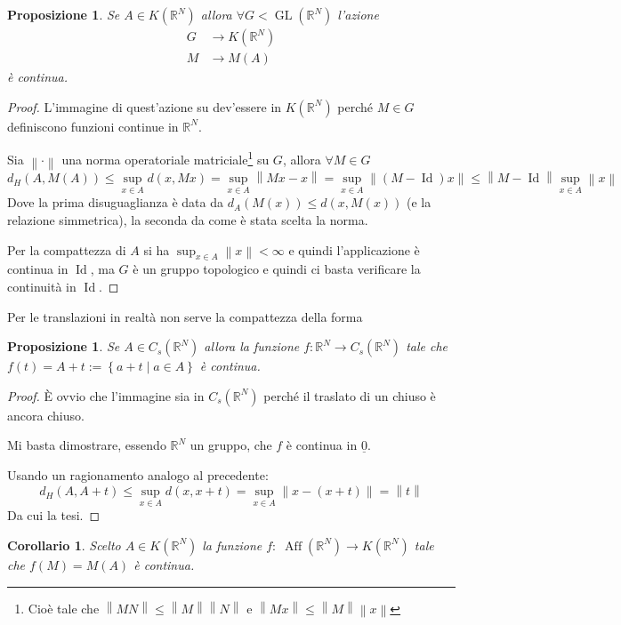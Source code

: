 \documentclass[a4paper,10pt]{article}
\newcounter{counter1}
\theoremstyle{plain}
\newtheorem{mypro}[counter1]{Proposizione}
\newtheorem{mycor}[counter1]{Corollario}
\theoremstyle{definition}
\theoremstyle{remark}
\newcommand{\ubar}[1]{\underline{#1}}
\newcommand{\set}[1]{\left\{#1\right\}}
\newcommand{\pa}[1]{\left(#1\right)}
\newcommand{\norm}[1]{\left\|#1\right\|}
\DeclareMathOperator{\id}{Id}
\DeclareMathOperator{\gl}{GL}
\DeclareMathOperator{\aff}{Aff}
\begin{document}
\begin{mypro}
  Se $A \in K(\mathbb{R}^N)$ allora $\forall G < \gl (\mathbb{R}^N)$
  l'azione
  \begin{align*}
    G &\rightarrow K(\mathbb{R}^N) \\  
    M &\rightarrow M(A)
  \end{align*}
  è continua.
\end{mypro}
\begin{proof}
  L'immagine di quest'azione su dev'essere in $K(\mathbb{R}^N)$ perché
  $M\in G$ definiscono funzioni continue in $\mathbb{R}^N$.

  Sia $\norm{\cdot}$ una norma operatoriale matriciale\footnote{Cioè
    tale che $\norm{MN} \le \norm{M}\norm{N}$ e $\norm{Mx} \le
    \norm{M}\norm{x}$} su $G$, allora $\forall M \in G$
  \[ d_H(A, M(A)) \le \sup _{x \in A} d(x,Mx) = \sup _{x \in A}
  \norm{Mx -x} = \sup _{x \in A} \norm{ \pa{ M - \id} x } \le \norm{ M
    - \id } \sup _{x \in A} \norm{x} \]
  Dove la prima disuguaglianza è data da $d_A (M(x)) \le d (x,M(x))$
  (e la relazione simmetrica), la seconda da come è stata scelta la
  norma.

  Per la compattezza di $A$ si ha $\sup _{x \in A} \norm{x} < \infty$ e quindi
  l'applicazione è continua in $\id$, ma $G$ è un gruppo topologico e
  quindi ci basta verificare la continuità in $\id$.
\end{proof}

Per le translazioni in realtà non serve la compattezza della forma
\begin{mypro}
  Se $A \in C_s(\mathbb{R}^N)$ allora la funzione $f: \mathbb{R}^N \to
  C_s(\mathbb{R}^N)$ tale che $f(t) = A + t := \set { a + t \mid a \in
    A}$ è continua.
\end{mypro}
\begin{proof}
  È ovvio che l'immagine sia in $C_s(\mathbb{R}^N)$ perché il traslato
  di un chiuso è ancora chiuso.
  
  Mi basta dimostrare, essendo $\mathbb{R}^N$ un gruppo, che $f$ è
  continua in $\ubar{0}$.
  
  Usando un ragionamento analogo al precedente:
  \[ d_H(A, A+t) \le \sup _{x \in A} d(x, x+t) = \sup _{x \in A}
  \norm{x-(x+t)} = \norm{t} \]
  Da cui la tesi.
\end{proof}

\begin{mycor}
  Scelto $A \in K(\mathbb{R}^N)$ la funzione $f:\; \aff( \mathbb{R}^N)
  \to K(\mathbb{R}^N)$ tale che $f(M) = M(A)$ è continua.
\end{mycor}
\end{document}

